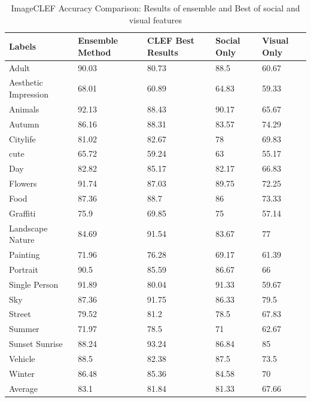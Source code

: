 \begin{table}
\centering
\caption{ ImageCLEF Accuracy Comparison:  Results of ensemble and Best of social and visual features} %
\vspace*{0.2 cm}
\begin{tabular}{| p{1.7cm}| p{1.5cm}|p{1.2cm}|p{1.2cm}|p{1.2cm}|} \hline
Labels & Ensemble Method & CLEF Best Results & Social Only & Visual Only  \\  [1ex] \hline
Adult & 90.03 & 80.73 & 88.5 & 60.67 \\ [1ex] \hline
Aesthetic Impression & 68.01 & 60.89 & 64.83 & 59.33 \\ [1ex] \hline
Animals & 92.13 & 88.43 & 90.17 & 65.67 \\ [1ex] \hline
Autumn & 86.16 & 88.31 & 83.57 & 74.29 \\ [1ex] \hline
Citylife & 81.02 & 82.67 & 78 & 69.83 \\ [1ex] \hline
cute & 65.72 & 59.24 & 63 & 55.17 \\ [1ex] \hline
Day & 82.82 & 85.17 & 82.17 & 66.83 \\ [1ex] \hline
Flowers & 91.74 & 87.03 & 89.75 & 72.25 \\ [1ex] \hline
Food & 87.36 & 88.7 & 86 & 73.33 \\ [1ex] \hline
Graffiti & 75.9 & 69.85 & 75 & 57.14 \\ [1ex] \hline
Landscape Nature & 84.69 & 91.54 & 83.67 & 77 \\ [1ex] \hline
Painting & 71.96 & 76.28 & 69.17 & 61.39 \\ [1ex] \hline
Portrait & 90.5 & 85.59 & 86.67 & 66 \\ [1ex] \hline
Single Person & 91.89 & 80.04 & 91.33 & 59.67 \\ [1ex] \hline
Sky & 87.36 & 91.75 & 86.33 & 79.5 \\ [1ex] \hline
Street & 79.52 & 81.2 & 78.5 & 67.83 \\ [1ex] \hline
Summer & 71.97 & 78.5 & 71 & 62.67 \\ [1ex] \hline
Sunset Sunrise & 88.24 & 93.24 & 86.84 & 85 \\ [1ex] \hline
Vehicle & 88.5 & 82.38 & 87.5 & 73.5 \\ [1ex] \hline
Winter & 86.48 & 85.36 & 84.58 & 70 \\ [1ex] \hline
Average & 83.1 & 81.84 & 81.33 & 67.66 \\ [1ex] \hline
\end{tabular}
 \label{ImageCLEFAccuracyOverAll} %
\end{table}




